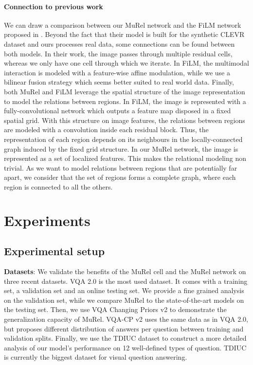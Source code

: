 \documentclass[10pt,twocolumn,letterpaper]{article}
\begin{document}
\paragraph{Connection to previous work}
We can draw a comparison between our MuRel network and the FiLM network proposed in \cite{perez2018film}. 
Beyond the fact that their model is built for the synthetic CLEVR dataset \cite{johnson2016clevr} and ours processes real data, some connections can be found between both models.
In their work, the image passes through multiple residual cells, whereas we only have one cell through which we iterate. In FiLM, the multimodal interaction is modeled with a feature-wise affine modulation, while we use a bilinear fusion strategy \cite{benyounescadene2017mutan} which seems better suited to real world data. 
Finally, both MuRel and FiLM leverage the spatial structure of the image representation to model the relations between regions.
In FiLM, the image is represented with a fully-convolutional network which outputs a feature map disposed in a fixed spatial grid. With this structure on image features, the relations between regions are modeled with a  convolution inside each residual block. Thus, the representation of each region depends on its neighbours in the locally-connected graph induced by the fixed grid structure. 
In our MuRel network, the image is represented as a set of localized features. This makes the relational modeling non trivial. As we want to model relations between regions that are potentially far apart, we consider that the set of regions forms a complete graph, where each region is connected to all the others.  \section{Experiments}

\subsection{Experimental setup}

\textbf{Datasets}: We validate the benefits of the MuRel cell and the MuRel network on three recent datasets. 
VQA 2.0 \cite{VQA2_Goyal_2017_CVPR} is the most used dataset. It comes with a training set, a validation set and an online testing set. We provide a fine grained analysis on the validation set, while we compare MuRel to the state-of-the-art models on the testing set.
Then, we use VQA Changing Priors v2 \cite{agrawal2018don} to demonstrate the generalization capacity of MuRel. VQA-CP v2 uses the same data as in VQA 2.0, but proposes different distribution of answers per question between training and validation splits.
Finally, we use the TDIUC dataset \cite{Kafle_2017_ICCV} to construct a more detailed analysis of our model's performance on 12 well-defined types of question. TDIUC is currently the biggest dataset for visual question answering.
\end{document}
